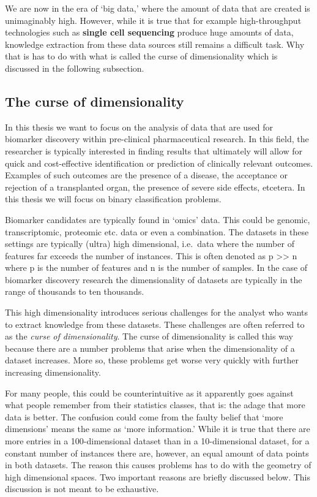 \documentclass[
]{article}
\begin{document}
We are now in the era of `big data,' where the amount of data that are created is unimaginably high. However, while it is true that for example high-throughput technologies such as \textbf{single cell sequencing} produce huge amounts of data, knowledge extraction from these data sources still remains a difficult task. Why that is has to do with what is called the curse of dimensionality which is discussed in the following subsection.

\hypertarget{the-curse-of-dimensionality}{%
\subsection{The curse of dimensionality}\label{the-curse-of-dimensionality}}

In this thesis we want to focus on the analysis of data that are used for biomarker discovery within pre-clinical pharmaceutical research. In this field, the researcher is typically interested in finding results that ultimately will allow for quick and cost-effective identification or prediction of clinically relevant outcomes. Examples of such outcomes are the presence of a disease, the acceptance or rejection of a transplanted organ, the presence of severe side effects, etcetera. In this thesis we will focus on binary classification problems.

Biomarker candidates are typically found in `omics' data. This could be genomic, transcriptomic, proteomic etc. data or even a combination. The datasets in these settings are typically (ultra) high dimensional, i.e.~data where the number of features far exceeds the number of instances. This is often denoted as p \textgreater\textgreater{} n where p is the number of features and n is the number of samples. In the case of biomarker discovery research the dimensionality of datasets are typically in the range of thousands to ten thousands.

This high dimensionality introduces serious challenges for the analyst who wants to extract knowledge from these datasets. These challenges are often referred to as the \emph{curse of dimensionality}. The curse of dimensionality is called this way because there are a number problems that arise when the dimensionality of a dataset increases. More so, these problems get worse very quickly with further increasing dimensionality.

For many people, this could be counterintuitive as it apparently goes against what people remember from their statistics classes, that is: the adage that more data is better. The confusion could come from the faulty belief that `more dimensions' means the same as `more information.' While it is true that there are more entries in a 100-dimensional dataset than in a 10-dimensional dataset, for a constant number of instances there are, however, an equal amount of data points in both datasets. The reason this causes problems has to do with the geometry of high dimensional spaces. Two important reasons are briefly discussed below. This discussion is not meant to be exhaustive.
\end{document}
